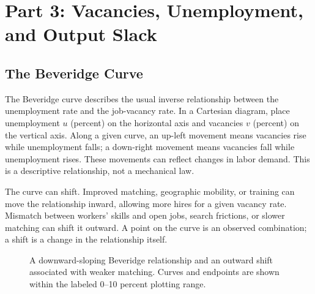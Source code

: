 \documentclass[11pt,letterpaper]{article}
\begin{document}
\section{Part 3: Vacancies, Unemployment, and Output Slack}
\subsection{The Beveridge Curve}
The Beveridge curve describes the usual inverse relationship between the unemployment rate and the job-vacancy rate. In a Cartesian diagram, place unemployment $u$ (percent) on the horizontal axis and vacancies $v$ (percent) on the vertical axis. Along a given curve, an up-left movement means vacancies rise while unemployment falls; a down-right movement means vacancies fall while unemployment rises. These movements can reflect changes in labor demand. This is a descriptive relationship, not a mechanical law.

The curve can shift. Improved matching, geographic mobility, or training can move the relationship inward, allowing more hires for a given vacancy rate. Mismatch between workers' skills and open jobs, search frictions, or slower matching can shift it outward. A point on the curve is an observed combination; a shift is a change in the relationship itself.

\begin{figure}[htbp]
\centering
{}
\caption{A downward-sloping Beveridge relationship and an outward shift associated with weaker matching. Curves and endpoints are shown within the labeled 0--10 percent plotting range.}
\label{fig:beveridge-curve}
\end{figure}
\end{document}
